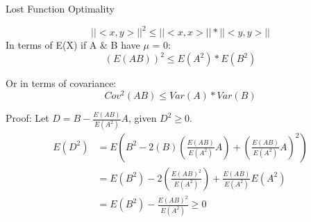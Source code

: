 \documentclass[11pt,fleqn]{book} %
\begin{document}
\begin{section}{Lost Function Optimality}
\begin{theorem}
	$$||<x,y>||^2 \le ||<x,x>|| * ||<y,y>||$$
In terms of E(X) if A \& B have $\mu$ = 0:
$$(E(AB))^2 \le E(A^2) * E(B^2)$$

Or in terms of covariance:
$$Cov^2(AB) \le Var(A)*Var(B)$$
\end{theorem}
Proof: Let $D = B - \frac{E(AB)}{E(A^2)}A$, given $D^2 \ge 0$.
	\begin{align*}
		E(D^2) &= E(B^2 - 2(B)(\frac{E(AB)}{E(A^2)}A)+(\frac{E(AB)}{E(A^2)}A)^2)\\
			&= E(B^2)-2\left( \frac{E(AB)^2}{E(A^2)} \right) + \frac{E(AB)}{E(A^2)}E(A^2)\\
			&= E(B^2) - \frac{E(AB)^2}{E(A^2)} \ge 0
	\end{align*}

\end{section}
\end{document}
